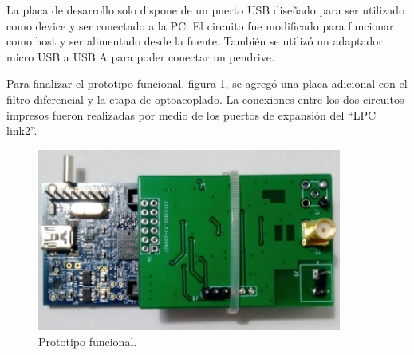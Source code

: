 La placa de desarrollo solo dispone de un puerto USB diseñado para ser utilizado como device y ser conectado a la PC. El circuito fue modificado para funcionar como host y ser alimentado desde la fuente. También se utilizó un adaptador micro USB a USB A para poder conectar un pendrive.  

Para finalizar el prototipo funcional, figura \ref{fig:hardProto}, se agregó una placa adicional con el filtro diferencial y la etapa de optoacoplado. La conexiones entre los dos circuitos impresos fueron realizadas por medio de los puertos de expansión del \enquote{LPC link2}. 

\vspace{10mm}

\begin{figure}[ht]
	\centering
	\includegraphics[width=100mm]{./Figures/hardProto.png}
	\caption{Prototipo funcional.}
	\label{fig:hardProto}
\end{figure}